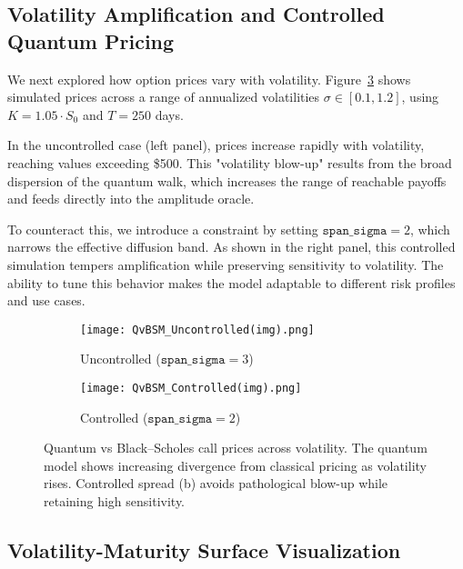 \documentclass[11pt]{article}
\begin{document}
\subsection{Volatility Amplification and Controlled Quantum Pricing}

We next explored how option prices vary with volatility. Figure~\ref{fig:quantum_volatility_comparison} shows simulated prices across a range of annualized volatilities $\sigma \in [0.1, 1.2]$, using $K = 1.05 \cdot S_0$ and $T = 250$ days.

In the uncontrolled case (left panel), prices increase rapidly with volatility, reaching values exceeding \$500. This "volatility blow-up" results from the broad dispersion of the quantum walk, which increases the range of reachable payoffs and feeds directly into the amplitude oracle.

To counteract this, we introduce a constraint by setting $\texttt{span\_sigma} = 2$, which narrows the effective diffusion band. As shown in the right panel, this controlled simulation tempers amplification while preserving sensitivity to volatility. The ability to tune this behavior makes the model adaptable to different risk profiles and use cases.

\begin{figure}[H]
    \centering
    \begin{subfigure}[b]{0.48\textwidth}
        \centering
        \texttt{[image: QvBSM\_Uncontrolled(img).png]}
        \caption{Uncontrolled ($\texttt{span\_sigma} = 3$)}
        \label{fig:quantum_uncontrolled}
    \end{subfigure}
    \hfill
    \begin{subfigure}[b]{0.48\textwidth}
        \centering
        \texttt{[image: QvBSM\_Controlled(img).png]}
        \caption{Controlled ($\texttt{span\_sigma} = 2$)}
        \label{fig:quantum_controlled}
    \end{subfigure}
    \caption{Quantum vs Black--Scholes call prices across volatility. The quantum model shows increasing divergence from classical pricing as volatility rises. Controlled spread (b) avoids pathological blow-up while retaining high sensitivity.}
    \label{fig:quantum_volatility_comparison}
\end{figure}

\subsection{Volatility-Maturity Surface Visualization}
\end{document}
